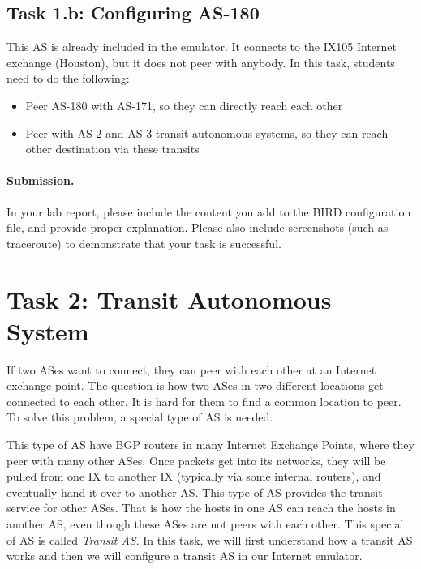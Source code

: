 \subsection{Task 1.b: Configuring AS-180} 

This AS is already included in the emulator. It connects to the
IX105 Internet exchange (Houston), but it does not peer with anybody. 
In this task, students need to do the following:


\begin{itemize}[noitemsep]
  \item Peer AS-180 with AS-171, so they can directly reach each other
  \item Peer with AS-2 and AS-3 transit autonomous systems, so they can
    reach other destination via these transits
\end{itemize}


\paragraph{Submission.}
In your lab report, please include the content you add to the 
BIRD configuration file, and provide proper explanation.
Please also include screenshots (such as traceroute) to demonstrate 
that your task is successful. 


\section{Task 2: Transit Autonomous System} 

If two ASes want to connect, they can peer with each other
at an Internet exchange point. The question is how two ASes in two different locations
get connected to each other. It is hard for them
to find a common location to peer. To solve this problem,
a special type of AS is needed.

This type of AS have BGP routers in many Internet
Exchange Points, where they peer with many other ASes. Once packets get into
its networks, they will be pulled from one IX to another IX (typically via
some internal routers), and eventually
hand it over to another AS. This type of AS provides the transit
service for other ASes. That is how the hosts in one AS can reach the hosts in
another AS, even though these ASes are not peers with each other.
This special of AS is called \textit{Transit AS}.
In this task, we will first understand how a transit AS works and
then we will configure a transit AS in our Internet emulator.  



